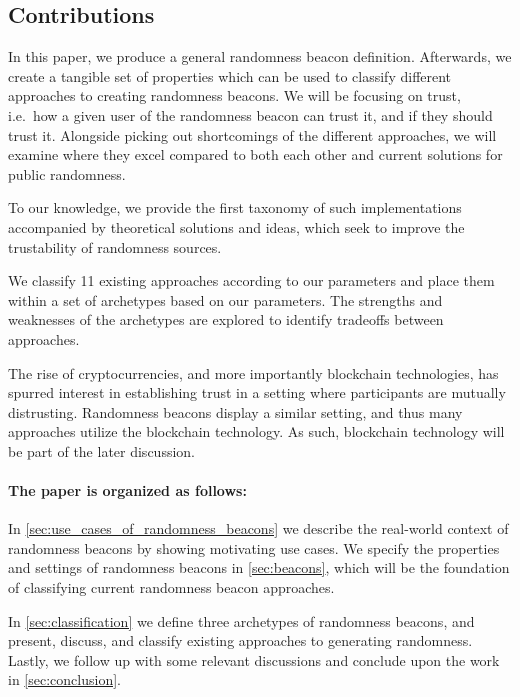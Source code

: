 \subsection*{Contributions}\label{subsec:contributions}
In this paper, we produce a general randomness beacon definition. Afterwards, we create a tangible set of properties which can be used to classify different approaches to creating randomness beacons.
We will be focusing on trust, i.e.\ how a given user of the randomness beacon can trust it, and if they should trust it.
Alongside picking out shortcomings of the different approaches, we will examine where they excel compared to both each other and current solutions for public randomness.

To our knowledge, we provide the first taxonomy of such implementations accompanied by theoretical solutions and ideas, which seek to improve the trustability of randomness sources.

We classify 11 existing approaches according to our parameters and place them within a set of archetypes based on our parameters. The strengths and weaknesses of the archetypes are explored to identify tradeoffs between approaches.

The rise of cryptocurrencies, and more importantly blockchain technologies, has spurred interest in establishing trust in a setting where participants are mutually distrusting.
Randomness beacons display a similar setting, and thus many approaches utilize the blockchain technology.
As such, blockchain technology will be part of the later discussion.

\paragraph{The paper is organized as follows:}
In \cref{sec:use_cases_of_randomness_beacons} we describe the real-world context of randomness beacons by showing motivating use cases.
We specify the properties and settings of randomness beacons in \cref{sec:beacons}, which will be the foundation of classifying current randomness beacon approaches.

In \cref{sec:classification} we define three archetypes of randomness beacons, and present, discuss, and classify existing approaches to generating randomness.
Lastly, we follow up with some relevant discussions and  conclude upon the work in \cref{sec:conclusion}.
